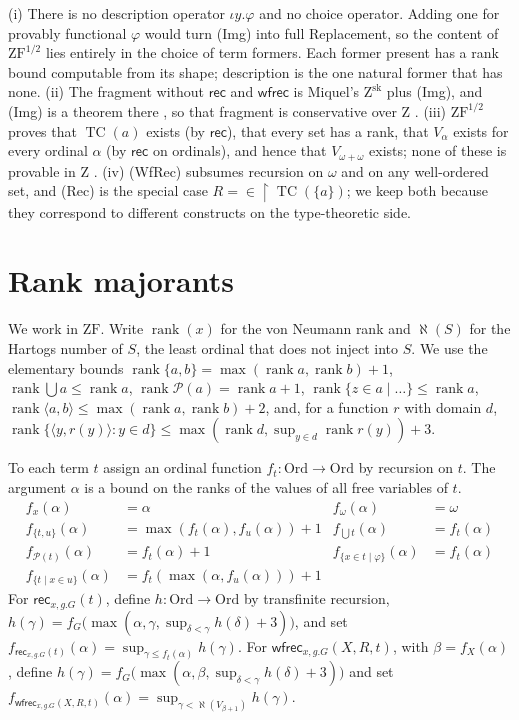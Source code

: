 \documentclass[10pt]{article}
\newcommand{\ZF}{\mathrm{ZF}}
\newcommand{\ZFh}{\mathrm{ZF}^{1/2}}
\newcommand{\Z}{\mathrm{Z}}
\newcommand{\Ord}{\mathrm{Ord}}
\newcommand{\rk}{\operatorname{rank}}
\newcommand{\TC}{\operatorname{TC}}
\newcommand{\PP}{\mathcal{P}}
\newcommand{\rec}{\mathsf{rec}}
\newcommand{\wfrec}{\mathsf{wfrec}}
\newcommand{\hartogs}{\aleph}
\begin{document}
\begin{remark}
(i) There is no description operator $\iota y.\varphi$ and no choice
operator. Adding one for provably functional $\varphi$ would turn (Img)
into full Replacement, so the content of $\ZFh$ lies entirely in the
choice of term formers. Each former present has a rank bound computable
from its shape; description is the one natural former that has none.
(ii) The fragment without $\rec$ and $\wfrec$ is Miquel's $\Z^{\mathrm{sk}}$
plus (Img), and (Img) is a theorem there \cite[Prop.~6]{miquel06}, so that
fragment is conservative over $\Z$ \cite[Prop.~5]{miquel06}.
(iii) $\ZFh$ proves that $\TC(a)$ exists (by $\rec$), that every set has
a rank, that $V_\alpha$ exists for every ordinal $\alpha$ (by $\rec$ on
ordinals), and hence that $V_{\omega+\omega}$ exists; none of these is
provable in $\Z$ \cite{esserhinnion99,mathias01}.
(iv) (WfRec) subsumes recursion on $\omega$ and on any well-ordered set,
and (Rec) is the special case $R={\in}{\restriction}\TC(\{a\})$; we keep
both because they correspond to different constructs on the type-theoretic
side.
\end{remark}

\section{Rank majorants}\label{sec:rank}

We work in $\ZF$. Write $\rk(x)$ for the von Neumann rank and
$\hartogs(S)$ for the Hartogs number of $S$, the least ordinal that does
not inject into $S$. We use the elementary bounds
$\rk\{a,b\}=\max(\rk a,\rk b)+1$, $\rk\bigcup a\le\rk a$,
$\rk\PP(a)=\rk a+1$, $\rk\{z\in a\mid\ldots\}\le\rk a$,
$\rk\langle a,b\rangle\le\max(\rk a,\rk b)+2$, and, for a function $r$
with domain $d$, $\rk\{\langle y,r(y)\rangle:y\in d\}\le\max(\rk d,\sup_{y\in d}\rk r(y))+3$.

\begin{definition}[majorants]\label{def:maj}
To each term $t$ assign an ordinal function $f_t:\Ord\to\Ord$ by
recursion on $t$. The argument $\alpha$ is a bound on the ranks of the
values of all free variables of $t$.
\begin{align*}
f_x(\alpha)&=\alpha & f_\omega(\alpha)&=\omega\\
f_{\{t,u\}}(\alpha)&=\max(f_t(\alpha),f_u(\alpha))+1 & f_{\bigcup t}(\alpha)&=f_t(\alpha)\\
f_{\PP(t)}(\alpha)&=f_t(\alpha)+1 & f_{\{x\in t\mid\varphi\}}(\alpha)&=f_t(\alpha)\\
f_{\{t\mid x\in u\}}(\alpha)&=f_t(\max(\alpha,f_u(\alpha)))+1
\end{align*}
For $\rec_{x,g.G}(t)$, define $h:\Ord\to\Ord$ by transfinite recursion,
$h(\gamma)=f_G\bigl(\max(\alpha,\gamma,\sup_{\delta<\gamma}h(\delta)+3)\bigr)$,
and set $f_{\rec_{x,g.G}(t)}(\alpha)=\sup_{\gamma\le f_t(\alpha)}h(\gamma)$.
For $\wfrec_{x,g.G}(X,R,t)$, with $\beta=f_X(\alpha)$, define
$h(\gamma)=f_G\bigl(\max(\alpha,\beta,\sup_{\delta<\gamma}h(\delta)+3)\bigr)$
and set $f_{\wfrec_{x,g.G}(X,R,t)}(\alpha)=\sup_{\gamma<\hartogs(V_{\beta+1})}h(\gamma)$.
\end{definition}
\end{document}
